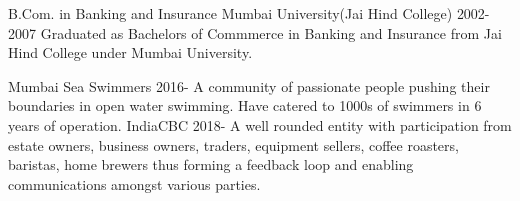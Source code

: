 \documentclass[11pt]{spidercv}
\begin{document}
\begin{MainPart}
    
    \Experience
        {\ColorHighlight}
		{B.Com. in Banking and Insurance}
		{Mumbai University(Jai Hind College)}
        {2002-2007}
        {   
            Graduated as Bachelors of Commmerce in Banking and Insurance from Jai Hind College under Mumbai University.
        }


    \Experience
        {\ColorHighlight}
		{Mumbai Sea Swimmers}
		{}
		{2016-\faUndo}
        {   
            A community of passionate people pushing their boundaries in open water swimming. Have catered to 1000s of swimmers in 6 years of operation.
        }
	\Experience
        {\ColorHighlight}
		{IndiaCBC}
		{}
		{2018-\faUndo}
        {   
            A well rounded entity with participation from estate owners, business owners, traders, equipment sellers, coffee roasters, baristas, home brewers thus forming a feedback loop and enabling communications amongst various parties.
        }
        
    \end{MainPart}

    
\end{document}
